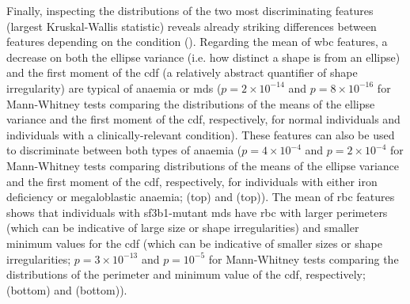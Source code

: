 Finally, inspecting the distributions of the two most discriminating features (largest Kruskal-Wallis statistic) reveals already striking differences between features depending on the condition (). Regarding the mean of \ac{wbc} features, a decrease on both the ellipse variance (i.e. how distinct a shape is from an ellipse) and the first moment of the \ac{cdf} (a relatively abstract quantifier of shape irregularity) are typical of anaemia or \ac{mds} ($p=2 \times 10^{-14}$ and $p=8 \times 10^{-16}$ for Mann-Whitney tests comparing the distributions of the means of the ellipse variance and the first moment of the \ac{cdf}, respectively, for normal individuals and individuals with a clinically-relevant condition). These features can also be used to discriminate between both types of anaemia ($p=4 \times 10^{-4}$ and $p=2 \times 10^{-4}$ for Mann-Whitney tests comparing distributions of the means of the ellipse variance and the first moment of the \ac{cdf}, respectively, for individuals with either iron deficiency or megaloblastic anaemia;  (top) and  (top)). The mean of \ac{rbc} features shows that individuals with \ac{sf3b1}-mutant \ac{mds} have \ac{rbc} with larger perimeters (which can be indicative of large size or shape irregularities) and smaller minimum values for the \ac{cdf} (which can be indicative of smaller sizes or shape irregularities; $p=3 \times 10^{-13}$ and $p=10^{-5}$ for Mann-Whitney tests comparing the distributions of the perimeter and minimum value of the \ac{cdf}, respectively;  (bottom) and  (bottom)).

\begin{figure}[!ht]
    \label{fig:feature-distribution-mean}
\end{figure}

\begin{figure}[!ht]
    \label{fig:feature-distribution-mean-examples}
\end{figure}

